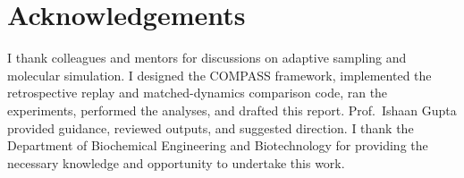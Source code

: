 \documentclass[12pt,a4paper,oneside]{report}
\begin{document}


\cleardoublepage

\chapter*{Acknowledgements}

I thank colleagues and mentors for discussions on adaptive sampling and molecular simulation. I designed the COMPASS framework, implemented the retrospective replay and matched-dynamics comparison code, ran the experiments, performed the analyses, and drafted this report. Prof.\ Ishaan Gupta provided guidance, reviewed outputs, and suggested direction. I thank the Department of Biochemical Engineering and Biotechnology for providing the necessary knowledge and opportunity to undertake this work.

\cleardoublepage



\end{document}
